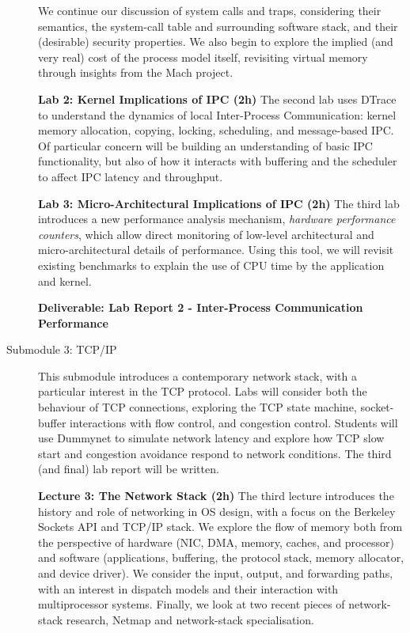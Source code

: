 \documentclass[a4paper,10pt]{article}
\begin{document}
\begin{description}
  We continue our discussion of system calls and traps,
  considering their semantics, the system-call table and surrounding software
  stack, and their (desirable) security properties.
  We also begin to explore the implied (and very real) cost of the process
  model itself, revisiting virtual memory through insights from the Mach
  project.

  \noindent
  \textbf{Lab 2: Kernel Implications of IPC (2h)}
  The second lab uses DTrace to understand the dynamics of local
  Inter-Process Communication: kernel memory allocation, copying, locking,
  scheduling, and message-based IPC.
  Of particular concern will be building an understanding of basic IPC
  functionality, but also of how it interacts with buffering and the scheduler
  to affect IPC latency and throughput.

  \noindent
  \textbf{Lab 3: Micro-Architectural Implications of IPC (2h)}
  The third lab introduces a new performance analysis mechanism,
  \textit{hardware performance counters}, which allow direct monitoring of
  low-level architectural and micro-architectural details of performance.
  Using this tool, we will revisit existing benchmarks to explain the use of
  CPU time by the application and kernel.

  \noindent
  \textbf{Deliverable: Lab Report 2 - Inter-Process Communication Performance}

\item[Submodule 3: TCP/IP]
  This submodule introduces a contemporary network stack, with a particular
  interest in the TCP protocol.
  Labs will consider both the behaviour of TCP connections, exploring the TCP
  state machine, socket-buffer interactions with flow control, and congestion
  control.
  Students will use Dummynet to simulate network latency and explore how TCP
  slow start and congestion avoidance respond to network conditions.
  The third (and final) lab report will be written.

  \noindent
  \textbf{Lecture 3: The Network Stack (2h)}
  The third lecture introduces the history and role of networking in OS
  design, with a focus on the Berkeley Sockets API and TCP/IP stack.
  We explore the flow of memory both from the perspective of hardware (NIC,
  DMA, memory, caches, and processor) and software (applications, buffering,
  the protocol stack, memory allocator, and device driver).
  We consider the input, output, and forwarding paths, with an interest in
  dispatch models and their interaction with multiprocessor systems.
  Finally, we look at two recent pieces of network-stack research, Netmap and
  network-stack specialisation.


\end{description}
\end{document}
